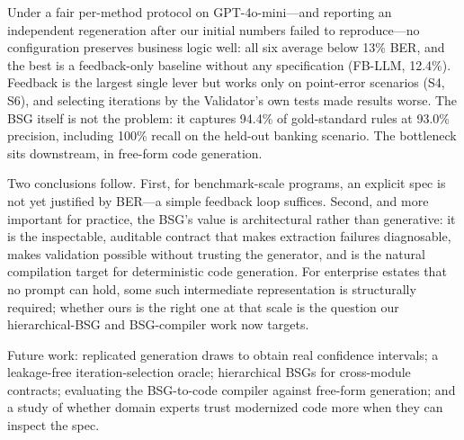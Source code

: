 \documentclass[conference]{IEEEtran}
\begin{document}
Under a fair per-method protocol on GPT-4o-mini---and reporting an independent regeneration after our initial numbers failed to reproduce---no configuration preserves business logic well: all six average below 13\% BER, and the best is a feedback-only baseline without any specification (FB-LLM, 12.4\%). Feedback is the largest single lever but works only on point-error scenarios (S4, S6), and selecting iterations by the Validator's own tests made results worse. The BSG itself is not the problem: it captures 94.4\% of gold-standard rules at 93.0\% precision, including 100\% recall on the held-out banking scenario. The bottleneck sits downstream, in free-form code generation.

Two conclusions follow. First, for benchmark-scale programs, an explicit spec is not yet justified by BER---a simple feedback loop suffices. Second, and more important for practice, the BSG's value is architectural rather than generative: it is the inspectable, auditable contract that makes extraction failures diagnosable, makes validation possible without trusting the generator, and is the natural compilation target for deterministic code generation. For enterprise estates that no prompt can hold, some such intermediate representation is structurally required; whether ours is the right one at that scale is the question our hierarchical-BSG and BSG-compiler work now targets.

Future work: replicated generation draws to obtain real confidence intervals; a leakage-free iteration-selection oracle; hierarchical BSGs for cross-module contracts; evaluating the BSG-to-code compiler against free-form generation; and a study of whether domain experts trust modernized code more when they can inspect the spec.
\end{document}
